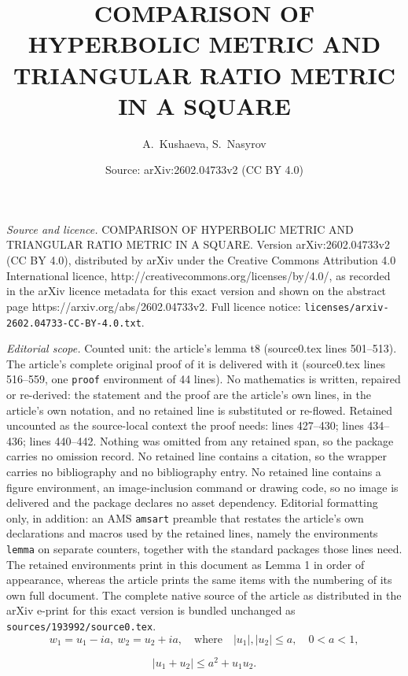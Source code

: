\documentclass[10pt,a4paper]{amsart}
\title{COMPARISON OF HYPERBOLIC METRIC AND\\ TRIANGULAR RATIO METRIC IN A SQUARE}
\author{A.~Kushaeva, S.~Nasyrov}
\date{Source: arXiv:2602.04733v2 (CC BY 4.0)}
\begin{document}
\maketitle

\noindent\emph{Source and licence.} COMPARISON OF HYPERBOLIC METRIC AND\\ TRIANGULAR RATIO METRIC IN A SQUARE. Version arXiv:2602.04733v2 (CC BY 4.0), distributed by arXiv under the Creative Commons Attribution 4.0 International licence, http://creativecommons.org/licenses/by/4.0/, as recorded in the arXiv licence metadata for this exact version and shown on the abstract page https://arxiv.org/abs/2602.04733v2. Full licence notice: \texttt{licenses/arxiv-2602.04733-CC-BY-4.0.txt}.\par\smallskip

\noindent\textit{Editorial scope.} Counted unit: the article's lemma t8 (source0.tex lines 501--513). The article's complete original proof of it is delivered with it (source0.tex lines 516--559, one \texttt{proof} environment of 44 lines). No mathematics is written, repaired or re-derived: the statement and the proof are the article's own lines, in the article's own notation, and no retained line is substituted or re-flowed.  Retained uncounted as the source-local context the proof needs: lines 427--430; lines 434--436; lines 440--442.  Nothing was omitted from any retained span, so the package carries no omission record.  No retained line contains a citation, so the wrapper carries no bibliography and no bibliography entry.  No retained line contains a figure environment, an image-inclusion command or drawing code, so no image is delivered and the package declares no asset dependency.  Editorial formatting only, in addition: an AMS \texttt{amsart} preamble that restates the article's own declarations and macros used by the retained lines, namely the environments \texttt{lemma} on separate counters, together with the standard packages those lines need.  The retained environments print in this document as Lemma 1 in order of appearance, whereas the article prints the same items with the numbering of its own full document.  The complete native source of the article as distributed in the arXiv e-print for this exact version is bundled unchanged as \texttt{sources/193992/source0.tex}.
\begin{equation}\label{w12}
w_1=u_1-ia, \ w_2=u_2+ia, \quad \text{where} \quad  |u_1|, |u_2|\le a,
\quad 0<a<1,
\end{equation}

\begin{equation}\label{13d}
|u_1+u_2|\le a^2+u_1u_2.
\end{equation}
\end{document}
